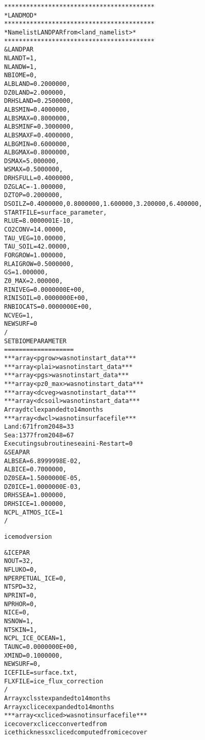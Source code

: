 \begin{alltt}
 *****************************************
 * LANDMOD                               *
 *****************************************
 * Namelist LANDPAR from <land_namelist> *
 *****************************************
 &LANDPAR
 NLANDT  =   1,
 NLANDW  =   1,
 NBIOME  =   0,
 ALBLAND =  0.2000000    ,
 DZ0LAND =   2.000000    ,
 DRHSLAND=  0.2500000,
 ALBSMIN =  0.4000000    ,
 ALBSMAX =  0.8000000    ,
 ALBSMINF=  0.3000000    ,
 ALBSMAXF=  0.4000000    ,
 ALBGMIN =  0.6000000    ,
 ALBGMAX =  0.8000000    ,
 DSMAX   =   5.000000    ,
 WSMAX   =  0.5000000    ,
 DRHSFULL=  0.4000000    ,
 DZGLAC  =  -1.000000    ,
 DZTOP   =  0.2000000    ,
 DSOILZ  =  0.4000000,0.8000000,1.600000,3.200000,6.400000,
 STARTFILE  = surface_parameter                                                               ,
 RLUE    =  8.0000001E-10,
 CO2CONV =   14.00000    ,
 TAU_VEG =   10.00000    ,
 TAU_SOIL=   42.00000    ,
 FORGROW =   1.000000    ,
 RLAIGROW =  0.5000000   ,
 GS      =   1.000000    ,
 Z0_MAX  =   2.000000    ,
 RINIVEG =  0.0000000E+00,
 RINISOIL =  0.0000000E+00,
 RNBIOCATS=  0.0000000E+00,
 NCVEG   =               1,
 NEWSURF =               0
 /
 SET BIOME PARAMETER
 ===================
 *** array <pgrow> was not in start_data ***
 *** array <plai> was not in start_data ***
 *** array <pgs> was not in start_data ***
 *** array <pz0_max> was not in start_data ***
 *** array <dcveg> was not in start_data ***
 *** array <dcsoil> was not in start_data ***
 Array {dtcl} expanded to 14 months
 *** array <dwcl> was not in surface file ***
 Land:   671 from  2048 =  33%
 Sea:   1377 from  2048 =  67%
 Executing subroutine seaini - Restart = 0
 &SEAPAR
 ALBSEA  =  6.8999998E-02,
 ALBICE  =  0.7000000    ,
 DZ0SEA  =  1.5000000E-05,
 DZ0ICE  =  1.0000000E-03,
 DRHSSEA =   1.000000    ,
 DRHSICE =   1.000000    ,
 NCPL_ATMOS_ICE  =           1
 /
  
 icemod version
  
 &ICEPAR
 NOUT    =          32,
 NFLUKO  =           0,
 NPERPETUAL_ICE  =   0,
 NTSPD   =          32,
 NPRINT  =           0,
 NPRHOR  =           0,
 NICE    =           0,
 NSNOW   =           1,
 NTSKIN  =           1,
 NCPL_ICE_OCEAN  =   1,
 TAUNC   =  0.0000000E+00,
 XMIND   =  0.1000000,
 NEWSURF =           0,
 ICEFILE = surface.txt                                                                     ,
 FLXFILE = ice_flux_correction                                                             
 /
 Array {xclsst} expanded to 14 months
 Array {xclicec} expanded to 14 months
 *** array <xcliced> was not in surface file ***
 ice cover {xclicec} converted from % to fraction
 ice thickness {xcliced} computed from ice cover


\end{alltt}

